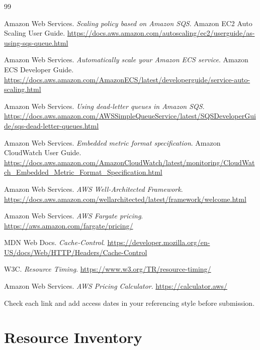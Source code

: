 \documentclass[a4paper,12pt]{article}
\begin{document}
\newpage
\begin{thebibliography}{99}

 Amazon Web Services. \emph{Scaling policy based on Amazon SQS}. Amazon EC2 Auto Scaling User Guide. \url{https://docs.aws.amazon.com/autoscaling/ec2/userguide/as-using-sqs-queue.html}

 Amazon Web Services. \emph{Automatically scale your Amazon ECS service}. Amazon ECS Developer Guide. \url{https://docs.aws.amazon.com/AmazonECS/latest/developerguide/service-auto-scaling.html}

 Amazon Web Services. \emph{Using dead-letter queues in Amazon SQS}. \url{https://docs.aws.amazon.com/AWSSimpleQueueService/latest/SQSDeveloperGuide/sqs-dead-letter-queues.html}

 Amazon Web Services. \emph{Embedded metric format specification}. Amazon CloudWatch User Guide. \url{https://docs.aws.amazon.com/AmazonCloudWatch/latest/monitoring/CloudWatch_Embedded_Metric_Format_Specification.html}

 Amazon Web Services. \emph{AWS Well-Architected Framework}. \url{https://docs.aws.amazon.com/wellarchitected/latest/framework/welcome.html}

 Amazon Web Services. \emph{AWS Fargate pricing}. \url{https://aws.amazon.com/fargate/pricing/}

 MDN Web Docs. \emph{Cache-Control}. \url{https://developer.mozilla.org/en-US/docs/Web/HTTP/Headers/Cache-Control}

 W3C. \emph{Resource Timing}. \url{https://www.w3.org/TR/resource-timing/}

 Amazon Web Services. \emph{AWS Pricing Calculator}. \url{https://calculator.aws/}

\end{thebibliography}
{\small\textcolor{mutedText}{Check each link and add access dates in your referencing style before submission.}}

\newpage
\appendix
\section{Resource Inventory}
\label{app:inventory}
\end{document}
